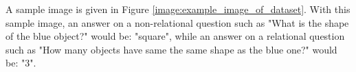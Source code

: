 \documentclass{setup}
\begin{document}
	A sample image is given in Figure \ref{image:example_image_of_dataset}. With this sample image, an answer on a non-relational question such as "What is the shape of the blue object?" would be: "square", while an answer on a relational question such as "How many objects have same the same shape as the blue one?" would be: "3".

	 
	 
	
\end{document}
